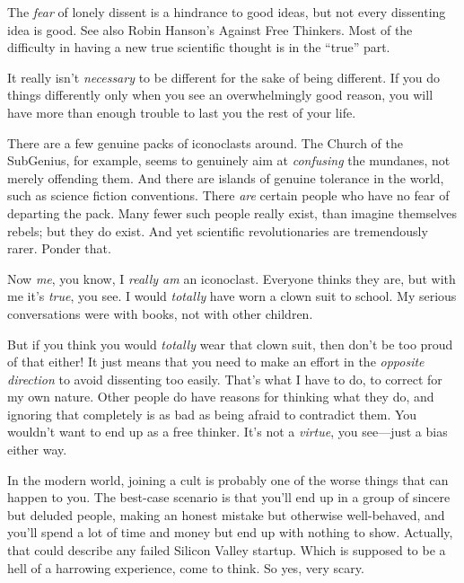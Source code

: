 {
 The \textit{fear} of lonely dissent is a hindrance to good ideas,
but not every dissenting idea is good. See also Robin
Hanson's Against Free Thinkers. Most of the difficulty
in having a new true scientific thought is in the
``true'' part.}

{
 It really isn't \textit{necessary} to be different
for the sake of being different. If you do things differently only when
you see an overwhelmingly good reason, you will have more than enough
trouble to last you the rest of your life.}

{
 There are a few genuine packs of iconoclasts around. The Church of
the SubGenius, for example, seems to genuinely aim at
\textit{confusing} the mundanes, not merely offending them. And there
are islands of genuine tolerance in the world, such as science fiction
conventions. There \textit{are} certain people who have no fear of
departing the pack. Many fewer such people really exist, than imagine
themselves rebels; but they do exist. And yet scientific
revolutionaries are tremendously rarer. Ponder that.}

{
 Now \textit{me}, you know, I \textit{really am} an iconoclast.
Everyone thinks they are, but with me it's
\textit{true}, you see. I would \textit{totally} have worn a clown suit
to school. My serious conversations were with books, not with other
children.}

{
 But if you think you would \textit{totally} wear that clown suit,
then don't be too proud of that either! It just means
that you need to make an effort in the \textit{opposite direction} to
avoid dissenting too easily. That's what I have to do,
to correct for my own nature. Other people do have reasons for thinking
what they do, and ignoring that completely is as bad as being afraid to
contradict them. You wouldn't want to end up as a free
thinker. It's not a \textit{virtue}, you see---just a
bias either way.}

\myendsectiontext


{
 In the modern world, joining a cult is probably one of the worse
things that can happen to you. The best-case scenario is that
you'll end up in a group of sincere but deluded people,
making an honest mistake but otherwise well-behaved, and
you'll spend a lot of time and money but end up with
nothing to show. Actually, that could describe any failed Silicon
Valley startup. Which is supposed to be a hell of a harrowing
experience, come to think. So yes, very scary. }

